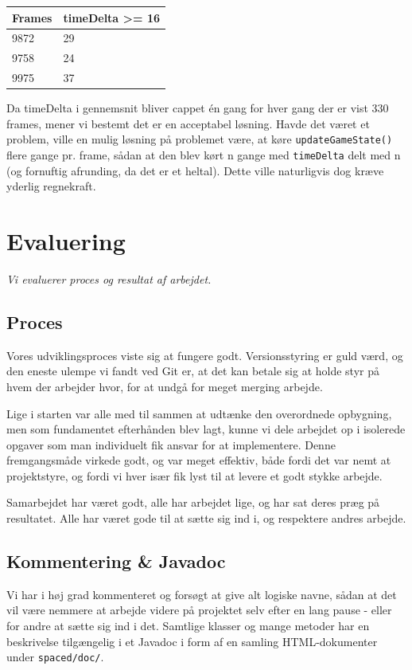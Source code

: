\documentclass[titlepage,danish]{article}
\newcommand{\code}[1]{\texttt{#1}}
\begin{document}
\begin{center}
    \begin{tabular}{ | l | l |}
    \hline
    Frames & timeDelta \textgreater= 16  \\ \hline
    9872 & 29 \\ \hline
    9758 & 24  \\ \hline
    9975 & 37  \\
    \hline
    \end{tabular}
\end{center}

Da timeDelta i gennemsnit bliver cappet én gang for hver gang der er vist 330 frames, mener vi bestemt det er en acceptabel løsning.
Havde det været et problem, ville en mulig løsning på problemet være, at køre \code{updateGameState()} flere gange pr. frame, sådan at den blev kørt n gange med \code{timeDelta} delt med n (og fornuftig afrunding, da det er et heltal). Dette ville naturligvis dog kræve yderlig regnekraft.

\section{Evaluering} \label{Evaluering}
\emph{Vi evaluerer proces og resultat af arbejdet.}
\subsection{Proces}
Vores udviklingsproces viste sig at fungere godt. Versionsstyring er guld værd, og den eneste
ulempe vi fandt ved Git er, at det kan betale sig at holde styr på hvem der arbejder hvor, for at
undgå for meget merging arbejde.

Lige i starten var alle med til sammen at udtænke den overordnede opbygning, men som fundamentet
efterhånden blev lagt, kunne vi dele arbejdet op i isolerede opgaver som man individuelt fik ansvar
for at implementere. Denne fremgangsmåde virkede godt, og var meget effektiv, både fordi det var
nemt at projektstyre, og fordi vi hver især fik lyst til at levere et godt stykke arbejde.

Samarbejdet har været godt, alle har arbejdet lige, og har sat deres præg på resultatet. Alle har været
gode til at sætte sig ind i, og respektere andres arbejde.

\subsection{Kommentering \& Javadoc}
Vi har i høj grad kommenteret og forsøgt at give alt logiske navne, sådan at det vil være nemmere at arbejde videre på projektet selv efter en lang pause - eller for andre at sætte sig ind i det. Samtlige klasser og mange metoder har en beskrivelse tilgængelig i et Javadoc i form af en samling HTML-dokumenter under \code{spaced/doc/}.
\end{document}
